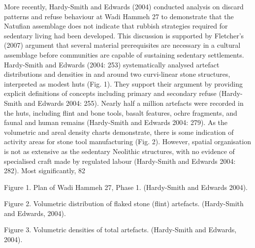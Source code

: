 \documentclass[%
	]{ijsra}
\begin{document}
More recently, Hardy-Smith and Edwards (2004) conducted analysis on discard patterns and refuse behaviour at Wadi Hammeh 27 to demonstrate that the Natufian assemblage does not indicate that rubbish strategies required for sedentary living had been developed. This discussion is supported by Fletcher’s (2007) argument that several material prerequisites are necessary in a cultural assemblage before communities are capable of sustaining sedentary settlements. Hardy-Smith and Edwards (2004: 253) systematically analysed artefact distributions and densities in and around two curvi-linear stone structures, interpreted as modest huts (Fig. 1). They support their argument by providing explicit definitions of concepts including primary and secondary refuse (Hardy-Smith and Edwards 2004: 255). Nearly half a million artefacts were recorded in the huts, including flint and bone tools, basalt features, ochre fragments, and faunal and human remains (Hardy-Smith and Edwards 2004: 279). As the volumetric and areal density charts demonstrate, there is some indication of activity areas for stone tool manufacturing (Fig. 2). However, spatial organisation is not as extensive as the sedentary Neolithic structures, with no evidence of specialised craft made by regulated labour (Hardy-Smith and Edwards 2004: 282). Most significantly, 82%

Figure 1. Plan of Wadi Hammeh 27, Phase 1. (Hardy-Smith and Edwards 2004).

Figure 2. Volumetric distribution of flaked stone (flint) artefacts. (Hardy-Smith and Edwards, 2004).

Figure 3. Volumetric densities of total artefacts. (Hardy-Smith and Edwards, 2004).
\end{document}
